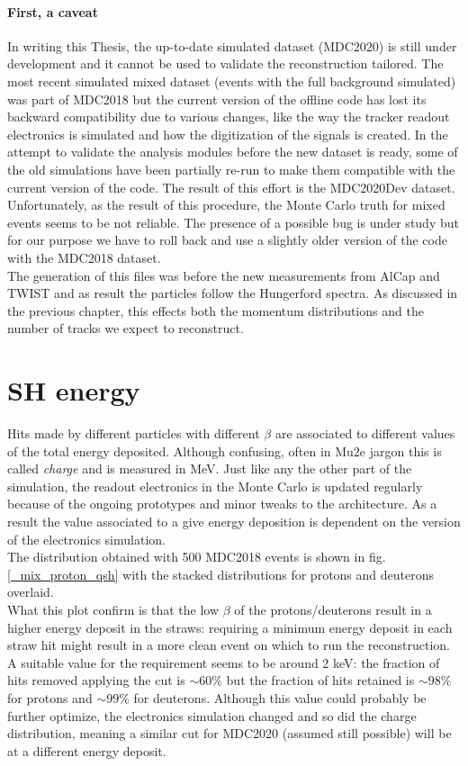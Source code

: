 \documentclass[12pt,a4paper,openright, oneside, titlepage]{book} %
\begin{document}
\paragraph{First, a caveat} In writing this Thesis, the up-to-date simulated dataset (MDC2020) is still under development and it cannot be used to validate the reconstruction tailored. 
The most recent simulated mixed dataset (events with the full background simulated) was part of MDC2018 but the current version of the offline code has lost its backward compatibility due to various changes, like the way the tracker readout electronics is simulated and how the digitization of the signals  is created. 
In the attempt to validate the analysis modules before the new dataset is ready, some of the old simulations have been partially re-run to make them compatible with the current version of the code. 
The result of this effort is the MDC2020Dev dataset.
Unfortunately, as the result of this procedure, the Monte Carlo truth for mixed events seems to be not reliable. 
The presence of a possible bug is under study but for our purpose we have to roll back and use a slightly older version of the code with the MDC2018 dataset. \\
The generation of this files was before the new measurements from AlCap and TWIST and as result the particles follow the Hungerford spectra. 
As discussed in the previous chapter, this effects both the momentum distributions and the number of tracks we expect to reconstruct. \\

\section{SH energy}
Hits made by different particles with different $\beta$ are associated to different values of the total energy deposited. 
Although confusing, often in Mu2e jargon this is called \textit{charge} and is measured in MeV.
Just like any the other part of the simulation, the readout electronics in the Monte Carlo is updated regularly because of the ongoing prototypes and minor tweaks to the architecture. 
As a result the value associated to a give energy deposition is dependent on the version of the electronics simulation.\\
The distribution obtained with 500 MDC2018 events is shown in fig. \ref{_mix_proton_qsh} with the stacked distributions for protons and deuterons overlaid.\\ 
What this plot confirm is that the low $\beta$ of the protons/deuterons result in a higher energy deposit in the straws: requiring a minimum energy deposit in each straw hit might result in a more clean event on which to run the reconstruction.\\
A suitable value for the requirement seems to be around 2 keV: the fraction of hits removed applying the cut is $\sim 60 \%$ but the fraction of hits retained is $\sim 98\%$ for protons and $\sim 99\%$ for deuterons.
Although this value could probably be further optimize, the electronics simulation changed and so did the charge distribution, meaning a similar cut for MDC2020 (assumed still possible) will be at a different energy deposit.
\end{document}
